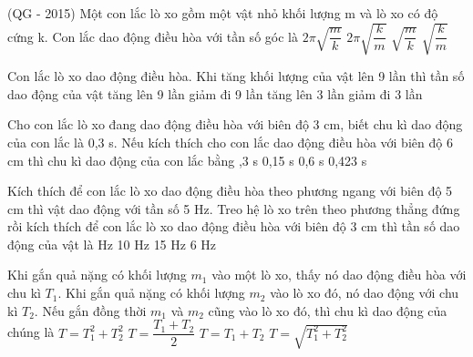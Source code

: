 \setcounter{ex}{0}
\setcounter{paragraph}{0}
\PhanI
\begin{ex}%
(QG - 2015) Một con lắc lò xo gồm một vật nhỏ khối lượng m và lò xo có độ cứng k. Con lắc dao động điều hòa với tần số góc là
\choice
{$2\pi \sqrt{\dfrac{m}{k}}$}
{$2\pi \sqrt{\dfrac{k}{m}}$}
{$\sqrt{\dfrac{m}{k}}$}
{\True $\sqrt{\dfrac{k}{m}}$}
\end{ex} 
\begin{ex}%
Con lắc lò xo dao động điều hòa. Khi tăng khối lượng của vật lên 9 lần thì tần số dao động của vật
\choice
{tăng lên 9 lần}
{giảm đi 9 lần}
{tăng lên 3 lần}
{\True giảm đi 3 lần}
\end{ex} 
\begin{ex}%
Cho con lắc lò xo đang dao động điều hòa với biên độ 3 cm, biết chu kì dao động của con lắc là 0,3 s. Nếu kích thích cho con lắc dao động điều hòa với biên độ 6 cm thì chu kì dao động của con lắc bằng
\choice
{,3 s}
{0,15 s}
{0,6 s}
{0,423 s}
\end{ex} 
\begin{ex}%
Kích thích để con lắc lò xo dao động điều hòa theo phương ngang với biên độ 5 cm thì vật dao động với tần số 5 Hz. Treo hệ lò xo trên theo phương thẳng đứng rồi kích thích để con lắc lò xo dao động điều hòa với biên độ 3 cm thì tần số dao động của vật là 
\choice
{ Hz}
{10 Hz}
{15 Hz}
{6 Hz}
\end{ex} 
\begin{ex}%
Khi gắn quả nặng có khối lượng $m_1$ vào một lò xo, thấy nó dao động điều hòa với chu kì $T_1$. Khi gắn quả nặng có khối lượng $m_2$ vào lò xo đó, nó dao động với chu kì $T_2$. Nếu gắn đồng thời $m_1$ và $m_2$ cũng vào lò xo đó, thì chu kì dao động của chúng là
\choice
{$T=T_1^2+T_2^2$}
{$T=\dfrac{{T_1+T_2}}{2}$}
{$T=T_1+T_2$}
{\True $T=\sqrt{{T_1^2+T_2^2}}$}


\end{ex} 
